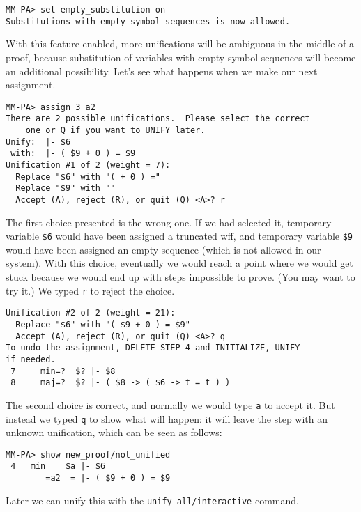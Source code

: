 \begin{verbatim}
MM-PA> set empty_substitution on
Substitutions with empty symbol sequences is now allowed.
\end{verbatim}

With this feature enabled, more unifications will be
ambiguous in
the middle of a proof, because
substitution
of variables with empty symbol sequences will become an additional
possibility.  Let's see what happens when we make our next assignment.

\begin{verbatim}
MM-PA> assign 3 a2
There are 2 possible unifications.  Please select the correct
    one or Q if you want to UNIFY later.
Unify:  |- $6
 with:  |- ( $9 + 0 ) = $9
Unification #1 of 2 (weight = 7):
  Replace "$6" with "( + 0 ) ="
  Replace "$9" with ""
  Accept (A), reject (R), or quit (Q) <A>? r
\end{verbatim}

The first choice presented is the wrong one.  If we had selected it,
temporary variable \texttt{\$6} would have been assigned a truncated
wff, and temporary variable \texttt{\$9} would have been assigned an
empty sequence (which is not allowed in our system).  With this choice,
eventually we would reach a point where we would get stuck because
we would end up with steps impossible to prove.  (You may want to
try it.)  We typed \texttt{r} to reject the choice.

\begin{verbatim}
Unification #2 of 2 (weight = 21):
  Replace "$6" with "( $9 + 0 ) = $9"
  Accept (A), reject (R), or quit (Q) <A>? q
To undo the assignment, DELETE STEP 4 and INITIALIZE, UNIFY
if needed.
 7     min=?  $? |- $8
 8     maj=?  $? |- ( $8 -> ( $6 -> t = t ) )
\end{verbatim}

The second choice is correct, and normally we would type \texttt{a}
to accept it.  But instead we typed \texttt{q} to show what will happen:
it will leave the step with an unknown unification, which can be
seen as follows:

\begin{verbatim}
MM-PA> show new_proof/not_unified
 4   min    $a |- $6
        =a2  = |- ( $9 + 0 ) = $9
\end{verbatim}

Later we can unify this with the \texttt{unify all/interactive} command.

